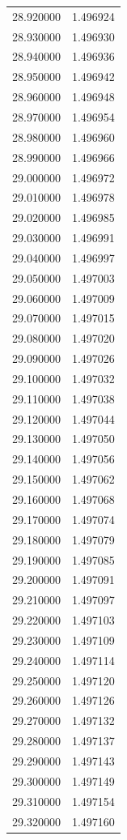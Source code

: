 \begin{tabular}{rr}
28.920000 & 1.496924 \\
28.930000 & 1.496930 \\
28.940000 & 1.496936 \\
28.950000 & 1.496942 \\
28.960000 & 1.496948 \\
28.970000 & 1.496954 \\
28.980000 & 1.496960 \\
28.990000 & 1.496966 \\
29.000000 & 1.496972 \\
29.010000 & 1.496978 \\
29.020000 & 1.496985 \\
29.030000 & 1.496991 \\
29.040000 & 1.496997 \\
29.050000 & 1.497003 \\
29.060000 & 1.497009 \\
29.070000 & 1.497015 \\
29.080000 & 1.497020 \\
29.090000 & 1.497026 \\
29.100000 & 1.497032 \\
29.110000 & 1.497038 \\
29.120000 & 1.497044 \\
29.130000 & 1.497050 \\
29.140000 & 1.497056 \\
29.150000 & 1.497062 \\
29.160000 & 1.497068 \\
29.170000 & 1.497074 \\
29.180000 & 1.497079 \\
29.190000 & 1.497085 \\
29.200000 & 1.497091 \\
29.210000 & 1.497097 \\
29.220000 & 1.497103 \\
29.230000 & 1.497109 \\
29.240000 & 1.497114 \\
29.250000 & 1.497120 \\
29.260000 & 1.497126 \\
29.270000 & 1.497132 \\
29.280000 & 1.497137 \\
29.290000 & 1.497143 \\
29.300000 & 1.497149 \\
29.310000 & 1.497154 \\
29.320000 & 1.497160 \\

\end{tabular}
